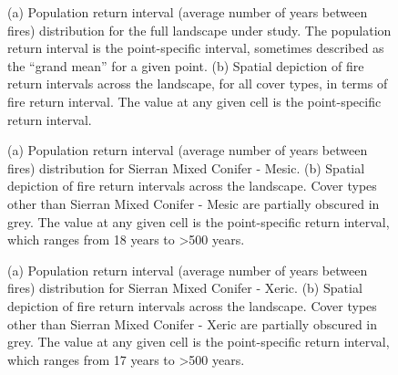 \begin{figure}[!htbp]
  \centering
  \qquad
  \caption{(a) Population return interval (average number of years between fires) distribution for the full landscape under study. The population return interval is the point-specific interval, sometimes described as the ``grand mean'' for a given point. (b) Spatial depiction of fire return intervals across the landscape, for all cover types, in terms of fire return interval. The value at any given cell is the point-specific return interval.}
  \label{fig:preturn}
\end{figure}

\begin{figure}[!htbp]
  \centering
  \caption{(a) Population return interval (average number of years between fires) distribution for Sierran Mixed Conifer - Mesic.  (b) Spatial depiction of fire return intervals across the landscape. Cover types other than Sierran Mixed Conifer - Mesic are partially obscured in grey. The value at any given cell is the point-specific return interval, which ranges from 18 years to \textgreater 500 years.}
\label{fig:preturn_smcm}
\end{figure}

\begin{figure}[!htbp]
  \centering
  \caption{(a) Population return interval (average number of years between fires) distribution for Sierran Mixed Conifer - Xeric.  (b) Spatial depiction of fire return intervals across the landscape. Cover types other than Sierran Mixed Conifer - Xeric are partially obscured in grey. The value at any given cell is the point-specific return interval, which ranges from 17 years to \textgreater 500 years.}
\label{fig:preturn_smcx}
\end{figure}

